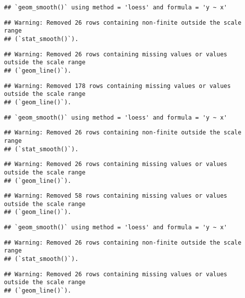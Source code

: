 \documentclass[
]{article}
\begin{document}
\begin{verbatim}
## `geom_smooth()` using method = 'loess' and formula = 'y ~ x'
\end{verbatim}

\begin{verbatim}
## Warning: Removed 26 rows containing non-finite outside the scale range
## (`stat_smooth()`).
\end{verbatim}

\begin{verbatim}
## Warning: Removed 26 rows containing missing values or values outside the scale range
## (`geom_line()`).
\end{verbatim}

\begin{verbatim}
## Warning: Removed 178 rows containing missing values or values outside the scale range
## (`geom_line()`).
\end{verbatim}

\begin{verbatim}
## `geom_smooth()` using method = 'loess' and formula = 'y ~ x'
\end{verbatim}

\begin{verbatim}
## Warning: Removed 26 rows containing non-finite outside the scale range
## (`stat_smooth()`).
\end{verbatim}

\begin{verbatim}
## Warning: Removed 26 rows containing missing values or values outside the scale range
## (`geom_line()`).
\end{verbatim}

\begin{verbatim}
## Warning: Removed 58 rows containing missing values or values outside the scale range
## (`geom_line()`).
\end{verbatim}

\begin{verbatim}
## `geom_smooth()` using method = 'loess' and formula = 'y ~ x'
\end{verbatim}

\begin{verbatim}
## Warning: Removed 26 rows containing non-finite outside the scale range
## (`stat_smooth()`).
\end{verbatim}

\begin{verbatim}
## Warning: Removed 26 rows containing missing values or values outside the scale range
## (`geom_line()`).
\end{verbatim}
\end{document}
